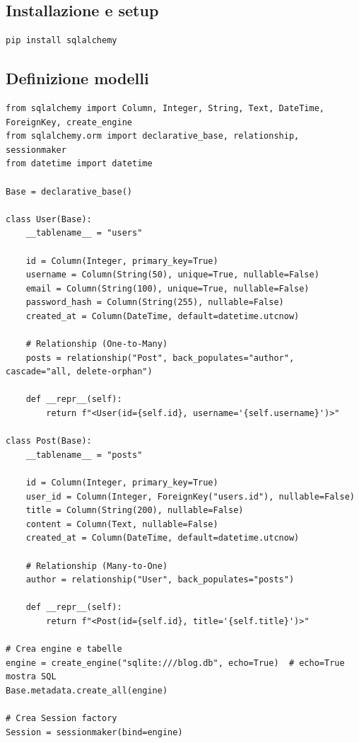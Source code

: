 \subsection{Installazione e setup}

\begin{lstlisting}[language=bash]
pip install sqlalchemy
\end{lstlisting}

\subsection{Definizione modelli}

\begin{lstlisting}
from sqlalchemy import Column, Integer, String, Text, DateTime, ForeignKey, create_engine
from sqlalchemy.orm import declarative_base, relationship, sessionmaker
from datetime import datetime

Base = declarative_base()

class User(Base):
    __tablename__ = "users"

    id = Column(Integer, primary_key=True)
    username = Column(String(50), unique=True, nullable=False)
    email = Column(String(100), unique=True, nullable=False)
    password_hash = Column(String(255), nullable=False)
    created_at = Column(DateTime, default=datetime.utcnow)

    # Relationship (One-to-Many)
    posts = relationship("Post", back_populates="author", cascade="all, delete-orphan")

    def __repr__(self):
        return f"<User(id={self.id}, username='{self.username}')>"

class Post(Base):
    __tablename__ = "posts"

    id = Column(Integer, primary_key=True)
    user_id = Column(Integer, ForeignKey("users.id"), nullable=False)
    title = Column(String(200), nullable=False)
    content = Column(Text, nullable=False)
    created_at = Column(DateTime, default=datetime.utcnow)

    # Relationship (Many-to-One)
    author = relationship("User", back_populates="posts")

    def __repr__(self):
        return f"<Post(id={self.id}, title='{self.title}')>"

# Crea engine e tabelle
engine = create_engine("sqlite:///blog.db", echo=True)  # echo=True mostra SQL
Base.metadata.create_all(engine)

# Crea Session factory
Session = sessionmaker(bind=engine)
\end{lstlisting}

